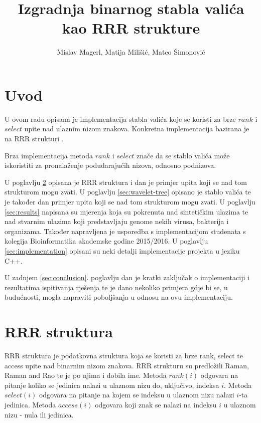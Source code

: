 \documentclass[times, utf8, seminar, numeric]{fer}
\begin{document}
\title{Izgradnja binarnog stabla valića kao RRR strukture}
\author{Mislav Magerl, Matija Milišić, Mateo Šimonović}

\maketitle

\tableofcontents

\chapter{Uvod}
U ovom radu opisana je implementacija stabla valića\citep{alexbowe}  koje se koristi za brze $rank$ i $select$ upite nad ulaznim nizom znakova. Konkretna implementacija bazirana je na RRR strukturi \citep{DBLP:journals/corr/abs-0705-0552}.



Brza implementacija metoda $rank$ i $select$ znače da se stablo valića može iskoristiti za pronalaženje podudarajućih nizova, odnosno podnizova. 

U poglavlju \ref{sec:rrr} opisana je RRR struktura i dan je primjer upita koji se nad tom strukturom mogu zvati. U poglavlju \ref{sec:wavelet-tree} opisano je stablo valića te je također dan primjer upita koji se nad tom strukturom mogu zvati. U poglavlju \ref{sec:results} napisana su mjerenja koja su pokrenuta nad sintetičkim ulazima te nad stvarnim ulazima koji predstavljaju genome nekih virusa, bakterija i organizama. Također napravljena je usporedba s implementacijom studenata s kolegija Bioinformatika akademske godine 2015/2016. U poglavlju \ref{sec:implementation} opisani su neki detalji implementacije projekta u jeziku C++.

U zadnjem \ref{sec:conclusion}. poglavlju dan je kratki zaključak o implementaciji i rezultatima ispitivanja rješenja te je dano nekoliko primjera gdje bi se, u budućnosti, mogla napraviti poboljšanja u odnosu na ovu implementaciju. 

\chapter{RRR struktura}
\label{sec:rrr}
RRR struktura je podatkovna struktura koja se koristi za brze rank, select te access upite nad binarnim nizom znakova. RRR strukturu su predložili Raman, Raman and Rao \citep{DBLP:journals/corr/abs-0705-0552} te je po njima i dobila ime. Metoda $rank(i)$ odgovara na pitanje koliko se jedinica nalazi u ulaznom nizu do, uključivo, indeksa $i$. Metoda $select(i)$ odgovara na pitanje na kojem se indeksu u ulaznom nizu nalazi $i$-ta jedinica. Metoda $access(i)$ odgovara koji znak se nalazi na indeksu $i$ u ulaznom nizu - nula ili jedinica.
\end{document}
